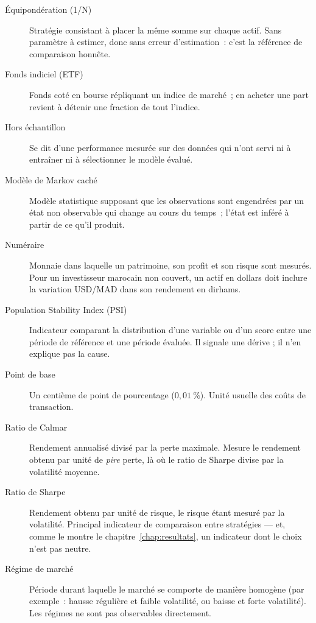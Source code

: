 \begin{description}
\item[Équipondération (1/N)] Stratégie consistant à placer la même somme sur
chaque actif. Sans paramètre à estimer, donc sans erreur d'estimation~: c'est la
référence de comparaison honnête.

\item[Fonds indiciel (ETF)] Fonds coté en bourse répliquant un indice de marché~;
en acheter une part revient à détenir une fraction de tout l'indice.

\item[Hors échantillon] Se dit d'une performance mesurée sur des données qui
n'ont servi ni à entraîner ni à sélectionner le modèle évalué.

\item[Modèle de Markov caché] Modèle statistique supposant que les observations
sont engendrées par un état non observable qui change au cours du temps~; l'état
est inféré à partir de ce qu'il produit.

\item[Numéraire] Monnaie dans laquelle un patrimoine, son profit et son risque
sont mesurés. Pour un investisseur marocain non couvert, un actif en dollars doit
inclure la variation USD/MAD dans son rendement en dirhams.

\item[Population Stability Index (PSI)] Indicateur comparant la distribution
d'une variable ou d'un score entre une période de référence et une période
évaluée. Il signale une dérive ; il n'en explique pas la cause.

\item[Point de base] Un centième de point de pourcentage ($0{,}01~\%$). Unité
usuelle des coûts de transaction.

\item[Ratio de Calmar] Rendement annualisé divisé par la perte maximale. Mesure
le rendement obtenu par unité de \emph{pire} perte, là où le ratio de Sharpe
divise par la volatilité moyenne.

\item[Ratio de Sharpe] Rendement obtenu par unité de risque, le risque étant
mesuré par la volatilité. Principal indicateur de comparaison entre stratégies —
et, comme le montre le chapitre~\ref{chap:resultats}, un indicateur dont le
choix n'est pas neutre.

\item[Régime de marché] Période durant laquelle le marché se comporte de manière
homogène (par exemple~: hausse régulière et faible volatilité, ou baisse et forte
volatilité). Les régimes ne sont pas observables directement.


\end{description}
